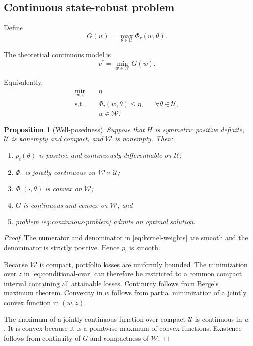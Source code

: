 \documentclass[11pt,a4paper]{article}
\newtheorem{proposition}{Proposition}
\theoremstyle{definition}
\theoremstyle{remark}
\newcommand{\U}{\mathcal{U}}
\newcommand{\W}{\mathcal{W}}
\begin{document}
\subsection{Continuous state-robust problem}

Define
\begin{equation}
G(w)=\max_{\theta\in\U}\Phi_\tau(w,\theta).
\label{eq:robust-objective}
\end{equation}

The theoretical continuous model is
\begin{equation}
v^*
=
\min_{w\in\W}G(w).
\label{eq:continuous-problem}
\end{equation}

Equivalently,
\begin{align}
\min_{w,\eta}\quad
&\eta
\\
\text{s.t.}\quad
&\Phi_\tau(w,\theta)\le\eta,
&&\forall\theta\in\U,
\\
&w\in\W.
\label{eq:sip}
\end{align}

\begin{proposition}[Well-posedness]
\label{prop:wellposed}
Suppose that \(H\) is symmetric positive definite, \(\U\) is nonempty and
compact, and \(\W\) is nonempty. Then:
\begin{enumerate}[label=(\roman*)]
    \item \(p_t(\theta)\) is positive and continuously differentiable on
    \(\U\);
    \item \(\Phi_\tau\) is jointly continuous on \(\W\times\U\);
    \item \(\Phi_\tau(\cdot,\theta)\) is convex on \(\W\);
    \item \(G\) is continuous and convex on \(\W\); and
    \item problem \eqref{eq:continuous-problem} admits an optimal solution.
\end{enumerate}
\end{proposition}

\begin{proof}
The numerator and denominator in \eqref{eq:kernel-weights} are smooth and the
denominator is strictly positive. Hence \(p_t\) is smooth.

Because \(\W\) is compact, portfolio losses are uniformly bounded. The
minimization over \(z\) in \eqref{eq:conditional-cvar} can therefore be
restricted to a common compact interval containing all attainable losses.
Continuity follows from Berge's maximum theorem. Convexity in \(w\) follows
from partial minimization of a jointly convex function in \((w,z)\).

The maximum of a jointly continuous function over compact \(\U\) is
continuous in \(w\). It is convex because it is a pointwise maximum of convex
functions. Existence follows from continuity of \(G\) and compactness of
\(\W\).
\end{proof}
\end{document}

